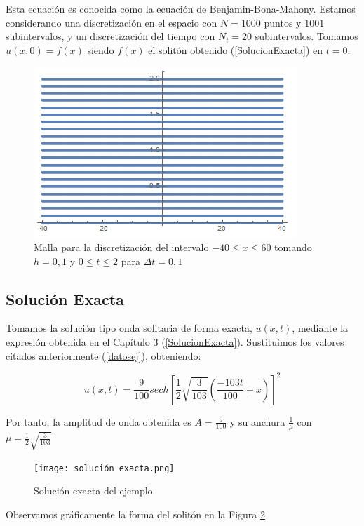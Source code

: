 Esta ecuación es conocida como la ecuación de Benjamin-Bona-Mahony. Estamos considerando una discretización en el espacio con $N=1000$ puntos y $1001$ subintervalos, y un discretización del tiempo con $N_{t}=20$ subintervalos. Tomamos $u(x,0)=f(x)$ siendo $f(x)$ el solitón obtenido (\ref{SolucionExacta}) en $t=0$.

\begin{figure}
  \centering
    \includegraphics{foto malla.png}
  \caption{Malla para la discretización del intervalo $-40\leq x \leq 60$ tomando $h=0,1$ y $0\leq t \leq 2$ para $\Delta t=0,1$}
  \label{fig:malla}
\end{figure}

\subsection{Solución Exacta}

Tomamos la solución tipo onda solitaria de forma exacta, $u(x,t)$, mediante la expresión obtenida en el Capítulo 3 (\ref{SolucionExacta}). Sustituimos los valores citados anteriormente (\ref{datosej}), obteniendo:

\begin{equation}
    u(x,t)=\frac{9}{100}sech\left[\frac{1}{2}\sqrt{\frac{3}{103}}\left(\frac{-103t}{100}+x\right)\right]^{2}
\end{equation}

Por tanto, la amplitud de onda obtenida es $A=\frac{9}{100}$ y su anchura $\frac{1}{\mu}$ con $\mu=\frac{1}{2}\sqrt{\frac{3}{103}}$

\begin{figure}
  \centering
    \texttt{[image: solución exacta.png]}
  \caption{Solución exacta del ejemplo}
   \label{fig:SolucionExacta1}
\end{figure} 

Observamos gráficamente la forma del solitón en la Figura \ref{fig:SolucionExacta1}


